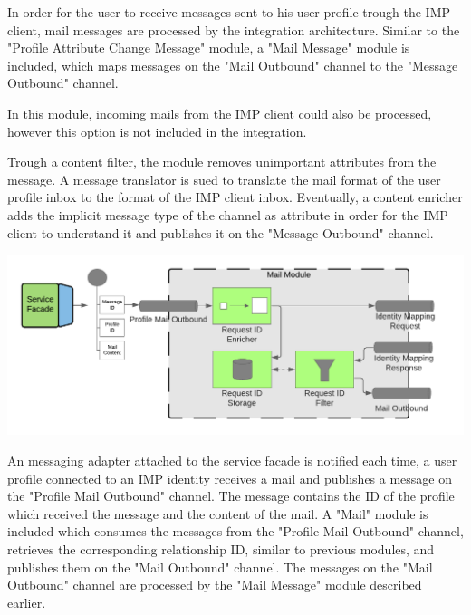 In order for the user to receive messages sent to his user profile trough the IMP client, mail messages are processed by the integration architecture. Similar to the "Profile Attribute Change Message" module, a "Mail Message" module is included, which maps messages on the "Mail Outbound" channel to the "Message Outbound" channel.

In this module, incoming mails from the IMP client could also be processed, however this option is not included in the integration.

Trough a content filter, the module removes unimportant attributes from the message. A message translator is sued to translate the mail format of the user profile inbox to the format of the IMP client inbox. Eventually, a content enricher adds the implicit message type of the channel as attribute in order for the IMP client to understand it and publishes it on the "Message Outbound" channel. 

\begin{center}
    \includegraphics[scale=0.6]{Diagrams/Integration Architecture 1/Technological Integration/13. Mail Module.pdf}
\end{center}

An messaging adapter attached to the service facade is notified each time, a user profile connected to an IMP identity receives a mail and publishes a message on the "Profile Mail Outbound" channel. The message contains the ID of the profile which received the message and the content of the mail. A "Mail" module is included which consumes the messages from the "Profile Mail Outbound" channel, retrieves the corresponding relationship ID, similar to previous modules, and publishes them on the "Mail Outbound" channel. The messages on the "Mail Outbound" channel are processed by the "Mail Message" module described earlier.

